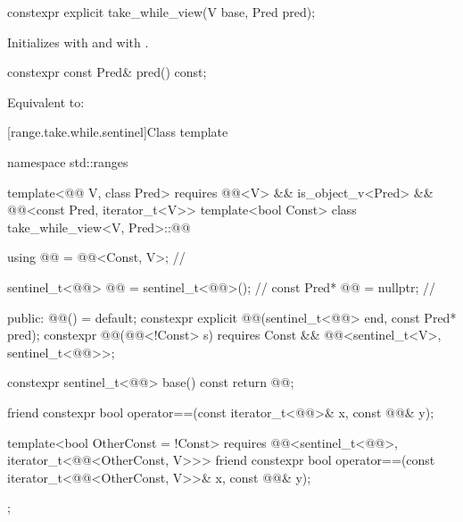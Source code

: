 %
\begin{itemdecl}
constexpr explicit take_while_view(V base, Pred pred);
\end{itemdecl}

\begin{itemdescr}
\pnum
\effects
Initializes  with  and
 with .
\end{itemdescr}

%
\begin{itemdecl}
constexpr const Pred& pred() const;
\end{itemdecl}

\begin{itemdescr}
\pnum
\effects
Equivalent to: 
\end{itemdescr}

[range.take.while.sentinel]{Class template }

\begin{codeblock}
namespace std::ranges {
  template<@@ V, class Pred>
    requires @@<V> && is_object_v<Pred> &&
             @@<const Pred, iterator_t<V>>
  template<bool Const>
  class take_while_view<V, Pred>::@@ {
    using @@ = @@<Const, V>;                 // \expos

    sentinel_t<@@> @@ = sentinel_t<@@>();         // \expos
    const Pred* @@ = nullptr;                        // \expos

  public:
    @@() = default;
    constexpr explicit @@(sentinel_t<@@> end, const Pred* pred);
    constexpr @@(@@<!Const> s)
      requires Const && @@<sentinel_t<V>, sentinel_t<@@>>;

    constexpr sentinel_t<@@> base() const { return @@; }

    friend constexpr bool operator==(const iterator_t<@@>& x, const @@& y);

    template<bool OtherConst = !Const>
      requires @@<sentinel_t<@@>, iterator_t<@@<OtherConst, V>>>
    friend constexpr bool operator==(const iterator_t<@@<OtherConst, V>>& x,
                                     const @@& y);
  };
}
\end{codeblock}

